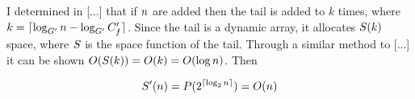 I determined in [...] that if $n$ are added then the tail is added to $k$ times, where $k = \lceil \log_{G'} n - \log_{G'} C_f' \rceil$. Since the tail is a dynamic array, it allocates $S(k)$ space, where $S$ is the space function of the tail. Through a similar method to [...] it can be shown $O(S(k)) = O(k) = O(\log n)$. Then %

\begin{align*}
S'(n) = P(2^{\lceil \log_2 n \rceil}) = O(n)
\end{align*}